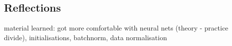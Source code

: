 \documentclass{article}
\begin{document}
  
  
 \subsection{Reflections} 
 
 material learned: got more comfortable with neural nets (theory - practice divide), initialisations, batchnorm, data normalisation 
 
 
\end{document}
